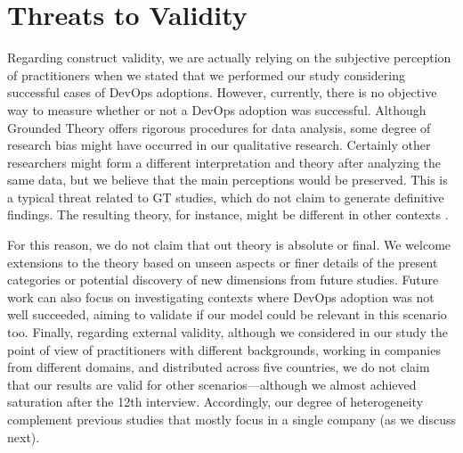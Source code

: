 \section{Threats to Validity} 

Regarding construct validity,  we are actually relying on the subjective perception of 
practitioners when we stated that we performed our study considering successful cases 
of DevOps adoptions. However, currently, there is no objective way to measure whether or not a 
DevOps adoption was successful. 
Although Grounded Theory offers rigorous procedures for data analysis, some degree of research bias 
might have occurred in our qualitative research. Certainly other researchers might form a different 
interpretation and theory after analyzing the same data,  but we believe that the main perceptions
would be preserved. This is a typical threat related to GT  
studies, which do not claim to generate definitive findings. The resulting theory, for instance, might
be different in other contexts \cite{hoda2012developing}. 

For this reason, we do not claim
that out theory is absolute or final. We welcome extensions to the theory based
on unseen aspects or finer details of the present categories or potential discovery
of new dimensions from future studies. 
Future work can also focus on investigating contexts
where DevOps adoption was not well succeeded, aiming to validate if our model could be
relevant in this scenario too. Finally, regarding external validity, although we 
considered in our study the point of view of practitioners with different 
backgrounds, working in companies from different domains, and distributed across 
five countries, we do not claim that our results are valid for 
other scenarios---although we almost achieved saturation 
after the 12th interview. Accordingly, our degree of heterogeneity complement 
previous studies that mostly focus in a single company (as we discuss next).    
